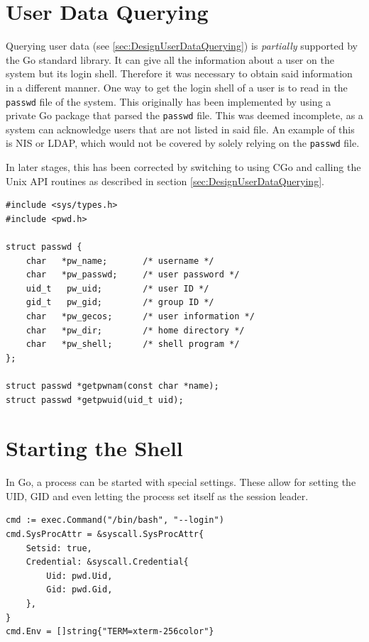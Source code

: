 \documentclass[10pt,a4paper,titlepage,twoside,english,final]{zhawreprt}
\begin{document}
\section{User Data Querying}\label{sec:ImplUserDataQuerying}
Querying user data (see \ref{sec:DesignUserDataQuerying}) is \textit{partially} supported by the \gls{Go} standard library.
It can give all the information about a user on the system but its \gls{login} \gls{shell}.
Therefore it was necessary to obtain said information in a different manner.
One way to get the \gls{login} \gls{shell} of a user is to read in the \texttt{passwd} file of the system.
This originally has been implemented by using a private \gls{Go} package that parsed the \texttt{passwd} file.
This was deemed incomplete, as a system can acknowledge users that are not listed in said file.
An example of this is \gls{NIS} or \gls{LDAP}, which would not be covered by solely relying on the \texttt{passwd} file.

In later stages, this has been corrected by switching to using \gls{CGo} and calling the \gls{Unix} \gls{API} routines \cite{getpw} as described in section \ref{sec:DesignUserDataQuerying}.

\setlistingC
\begin{lstlisting}[caption={Definition of passwd and {\cite{getpw}}},label=lst:PasswdDefinition]
#include <sys/types.h>
#include <pwd.h>

struct passwd {
	char   *pw_name;       /* username */
	char   *pw_passwd;     /* user password */
	uid_t   pw_uid;        /* user ID */
	gid_t   pw_gid;        /* group ID */
	char   *pw_gecos;      /* user information */
	char   *pw_dir;        /* home directory */
	char   *pw_shell;      /* shell program */
};

struct passwd *getpwnam(const char *name);
struct passwd *getpwuid(uid_t uid);
\end{lstlisting}

\section{Starting the Shell}\label{sec:ImplStartingTheShell}
In \gls{Go}, a process can be started with special settings.
These allow for setting the \gls{UID}, \gls{GID} and even letting the process set itself as the session leader.

\setlistingGo
\begin{lstlisting}[caption={Starting a process in \gls{Go}},label=lst:StartingAProcessInGo]
cmd := exec.Command("/bin/bash", "--login")
cmd.SysProcAttr = &syscall.SysProcAttr{
	Setsid: true,
	Credential: &syscall.Credential{
		Uid: pwd.Uid,
		Gid: pwd.Gid,
	},
}
cmd.Env = []string{"TERM=xterm-256color"}
\end{lstlisting}
\end{document}
